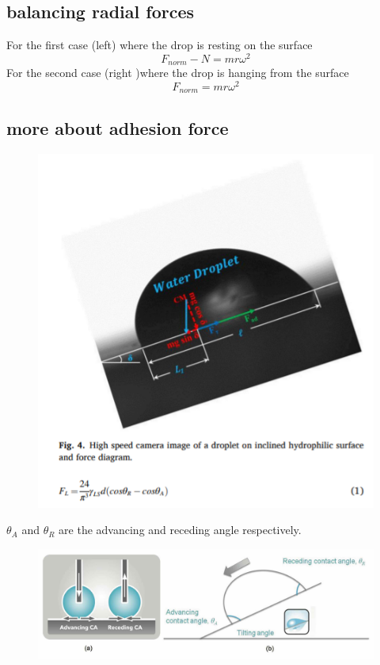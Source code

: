 \documentclass{scrartcl}
\begin{document}
\subsection{balancing radial forces}
For the first case (left) where the drop is resting on the surface
\begin{equation}
    F_{norm}-N= mr\omega ^2 
\end{equation}
For the second case (right )where the drop is hanging from the surface 
\begin{equation}
    F_{norm}= mr\omega ^2 
\end{equation}

\subsection{more about adhesion force}
\begin{figure}[h]
    \centering
    \includegraphics[scale=1.1]{adhesion equation from research paper.png}
\end{figure}

$\theta_A$ and $\theta_R$ are the advancing and receding angle respectively. 

\begin{figure}
    \includegraphics[width=\linewidth]{Dynamic-Contact-Angle-Measurement.jpg}
\end{figure}
\end{document}

